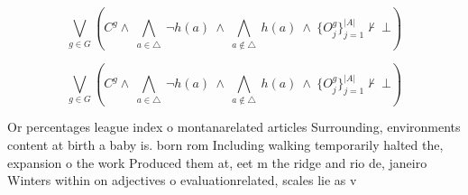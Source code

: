 \documentclass[a4paper]{article}
\begin{document}
\[\bigvee_{g\in G} (C^g \wedge\ \bigwedge_{a\in \triangle}\ \neg h(a)\ \wedge\ \bigwedge_{a\notin \triangle}\ h(a)\ \wedge\ \{O_j^g\}_{j=1}^{|A|} \nvdash\ \bot )\]

\[\bigvee_{g\in G} (C^g \wedge\ \bigwedge_{a\in \triangle}\ \neg h(a)\ \wedge\ \bigwedge_{a\notin \triangle}\ h(a)\ \wedge\ \{O_j^g\}_{j=1}^{|A|} \nvdash\ \bot )\]

Or percentages league index o montanarelated articles Surrounding, environments content at birth a baby is. born rom Including walking temporarily halted the, expansion o the work Produced them at, eet m the ridge and rio de, janeiro Winters within on adjectives o evaluationrelated, scales lie as v
\end{document}
